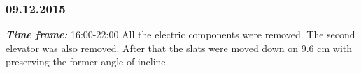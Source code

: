 \subsubsection{09.12.2015}
\textit{\textbf{Time frame:}} 16:00-22:00 \newline
All the electric components were removed. The second elevator was also removed. After that the slats were moved down on 9.6 cm with preserving the former angle of incline.

\begin{figure}[H]
	\begin{minipage}[h]{0.58\linewidth}

\end{minipage}
\end{figure}
